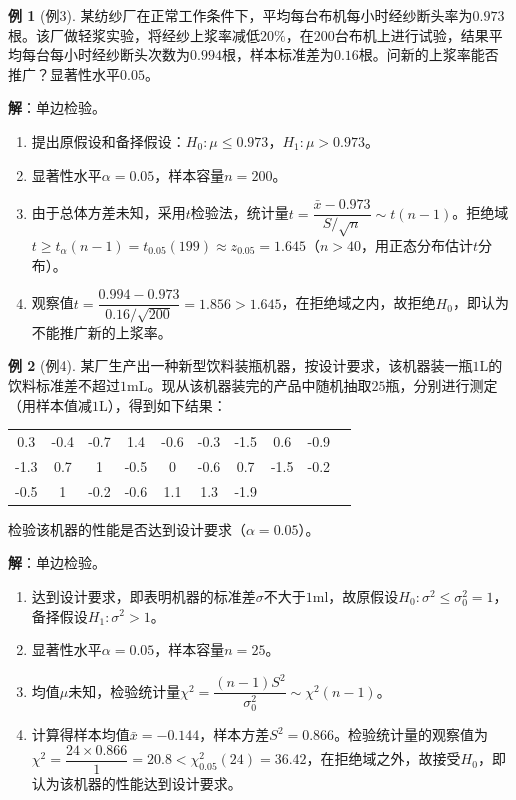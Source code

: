 \documentclass[11pt,a4paper]{report}
\theoremstyle{definition}
\newtheorem{example}{例}[chapter]
\theoremstyle{plain}
\begin{document}
\begin{example}[例3]
某纺纱厂在正常工作条件下，平均每台布机每小时经纱断头率为$0.973$根。该厂做轻浆实验，将经纱上浆率减低$20\%$，在$200$台布机上进行试验，结果平均每台每小时经纱断头次数为$0.994$根，样本标准差为$0.16$根。问新的上浆率能否推广？显著性水平$0.05$。

\textbf{解}：单边检验。
\begin{enumerate}[label=步骤\arabic*.,leftmargin=2em]
    \item 提出原假设和备择假设：$H_0:\mu\leq 0.973$，$H_1:\mu>0.973$。
    \item 显著性水平$\alpha=0.05$，样本容量$n=200$。
    \item 由于总体方差未知，采用$t$检验法，统计量$t=\dfrac{\bar{x}-0.973}{S/\sqrt{n}}\sim t(n-1)$。拒绝域$t\geq t_\alpha(n-1)=t_{0.05}(199)\approx z_{0.05}=1.645$（$n>40$，用正态分布估计$t$分布）。
    \item 观察值$t=\dfrac{0.994-0.973}{0.16/\sqrt{200}}=1.856>1.645$，在拒绝域之内，故拒绝$H_0$，即认为不能推广新的上浆率。
\end{enumerate}
\end{example}

\begin{example}[例4]
某厂生产出一种新型饮料装瓶机器，按设计要求，该机器装一瓶$1$L的饮料标准差不超过$1$mL。现从该机器装完的产品中随机抽取$25$瓶，分别进行测定（用样本值减$1$L），得到如下结果：
\begin{center}
\begin{tabular}{cccccccccc}
0.3 & -0.4 & -0.7 & 1.4 & -0.6 & -0.3 & -1.5 & 0.6 & -0.9 \\
-1.3 & 0.7 & 1 & -0.5 & 0 & -0.6 & 0.7 & -1.5 & -0.2 \\
-0.5 & 1 & -0.2 & -0.6 & 1.1 & 1.3 & -1.9
\end{tabular}
\end{center}
检验该机器的性能是否达到设计要求（$\alpha=0.05$）。

\textbf{解}：单边检验。
\begin{enumerate}[label=步骤\arabic*.,leftmargin=2em]
    \item 达到设计要求，即表明机器的标准差$\sigma$不大于$1$ml，故原假设$H_0:\sigma^2\leq\sigma_0^2=1$，备择假设$H_1:\sigma^2>1$。
    \item 显著性水平$\alpha=0.05$，样本容量$n=25$。
    \item 均值$\mu$未知，检验统计量$\chi^2=\dfrac{(n-1)S^2}{\sigma_0^2}\sim\chi^2(n-1)$。
    \item 计算得样本均值$\bar{x}=-0.144$，样本方差$S^2=0.866$。检验统计量的观察值为$\chi^2=\dfrac{24\times 0.866}{1}=20.8<\chi_{0.05}^2(24)=36.42$，在拒绝域之外，故接受$H_0$，即认为该机器的性能达到设计要求。
\end{enumerate}
\end{example}
\end{document}
